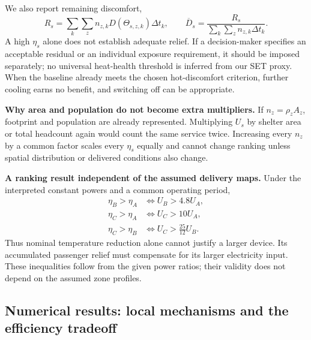 \documentclass[12pt]{article}
\begin{document}
We also report remaining discomfort,
\begin{equation}
 R_s=\sum_k\sum_z n_{z,k}D(\Theta_{s,z,k})\Delta t_k,
 \qquad \overline D_s=\frac{R_s}{\sum_k\sum_z n_{z,k}\Delta t_k}.
\label{eq:remaining}
\end{equation}
A high $\eta_s$ alone does not establish adequate relief. If a decision-maker specifies an acceptable residual or an individual exposure requirement, it should be imposed separately; no universal heat-health threshold is inferred from our SET proxy. When the baseline already meets the chosen hot-discomfort criterion, further cooling earns no benefit, and switching off can be appropriate.

\noindent\textbf{Why area and population do not become extra multipliers.} If $n_z=\rho_zA_z$, footprint and population are already represented. Multiplying $U_s$ by shelter area or total headcount again would count the same service twice. Increasing every $n_z$ by a common factor scales every $\eta_s$ equally and cannot change ranking unless spatial distribution or delivered conditions also change.

\noindent\textbf{A ranking result independent of the assumed delivery maps.} Under the interpreted constant powers and a common operating period,
\begin{align}
 \eta_B>\eta_A&\iff U_B>4.8U_A,\nonumber\\
 \eta_C>\eta_A&\iff U_C>10U_A,\\
 \eta_C>\eta_B&\iff U_C>\frac{25}{12}U_B.\nonumber
\label{eq:break-even}
\end{align}
Thus nominal temperature reduction alone cannot justify a larger device. Its accumulated passenger relief must compensate for its larger electricity input. These inequalities follow from the given power ratios; their validity does not depend on the assumed zone profiles.

\clearpage
\subsection{Numerical results: local mechanisms and the efficiency tradeoff}
\end{document}
